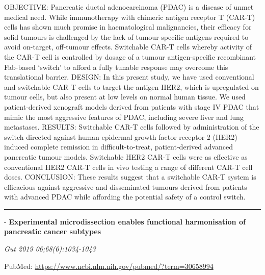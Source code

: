 \documentclass[]{article}
\begin{document}
OBJECTIVE: Pancreatic ductal adenocarcinoma (PDAC) is a disease of unmet
medical need. While immunotherapy with chimeric antigen receptor T
(CAR-T) cells has shown much promise in haematological malignancies,
their efficacy for solid tumours is challenged by the lack of
tumour-specific antigens required to avoid on-target, off-tumour
effects. Switchable CAR-T cells whereby activity of the CAR-T cell is
controlled by dosage of a tumour antigen-specific recombinant Fab-based
`switch' to afford a fully tunable response may overcome this
translational barrier. DESIGN: In this present study, we have used
conventional and switchable CAR-T cells to target the antigen HER2,
which is upregulated on tumour cells, but also present at low levels on
normal human tissue. We used patient-derived xenograft models derived
from patients with stage IV PDAC that mimic the most aggressive features
of PDAC, including severe liver and lung metastases. RESULTS: Switchable
CAR-T cells followed by administration of the switch directed against
human epidermal growth factor receptor 2 (HER2)-induced complete
remission in difficult-to-treat, patient-derived advanced pancreatic
tumour models. Switchable HER2 CAR-T cells were as effective as
conventional HER2 CAR-T cells in vivo testing a range of different CAR-T
cell doses. CONCLUSION: These results suggest that a switchable CAR-T
system is efficacious against aggressive and disseminated tumours
derived from patients with advanced PDAC while affording the potential
safety of a control switch.

{}

{}

\begin{center}\rule{0.5\linewidth}{\linethickness}\end{center}

 - \textbf{Experimental microdissection enables functional harmonisation
of pancreatic cancer subtypes}

\emph{Gut 2019 06;68(6):1034-1043}

PubMed: \url{https://www.ncbi.nlm.nih.gov/pubmed/?term=30658994}
\end{document}
